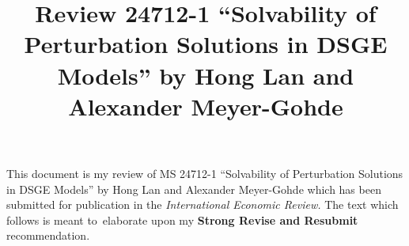 \documentclass[12pt]{article}
\title{Review 24712-1 ``Solvability of Perturbation Solutions in DSGE Models'' by Hong Lan and Alexander Meyer-Gohde}
\begin{document}
\maketitle


\makeatletter
\def\fullpath{\begingroup\everyeof{\noexpand}\@sanitize
  \edef\x{\@@input|"find `pwd` -name \jobname.tex" }%
  \edef\x{\endgroup\noexpand\zap@space\x\noexpand\@empty}\x}
\makeatother




This document is my review of
MS 24712-1 ``Solvability of Perturbation Solutions in DSGE Models'' by Hong Lan and Alexander Meyer-Gohde which has been submitted for publication in 
the {\em International Economic Review.}
The text which follows is meant to\ elaborate upon my {\bf Strong Revise and Resubmit} recommendation.
\end{document}
